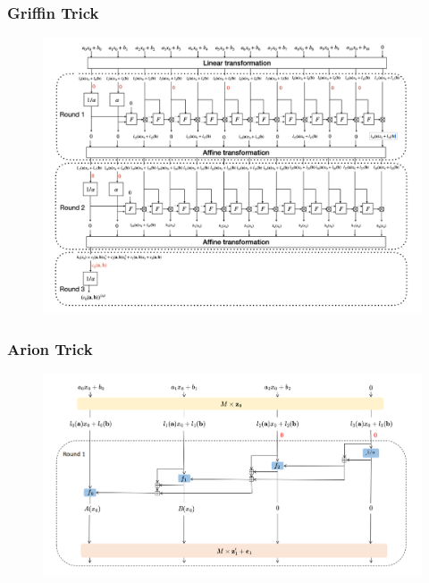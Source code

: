 \documentclass[aspectratio=169]{beamer}
\begin{document}
\appendix


\begin{frame}
  \frametitle{Griffin Trick}
  \begin{figure}
    \centering
    \includegraphics[height=.9\textheight]{./figures/griffin-trick.png}
  \end{figure}
\end{frame}

\begin{frame}
  \frametitle{Arion Trick}
  \begin{figure}
    \centering
    \includegraphics[height=.9\textheight]{./figures/arion-trick.png}
  \end{figure}
\end{frame}
\end{document}
